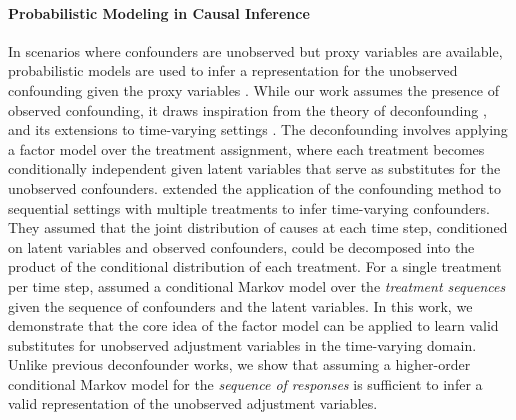 \documentclass[10pt]{article} %
\begin{document}
\paragraph{Probabilistic Modeling in Causal Inference} In scenarios where confounders are unobserved but proxy variables are available, probabilistic models are used to infer a representation for the unobserved confounding given the proxy variables \citep{MeasbiasproxyConf, MiaoProxyUnmeasuredConf2016, louizos2017causalproxyconf, LuChengCMAproxynConf20121}. While our work assumes the presence of observed confounding, it draws inspiration from the theory of deconfounding \citep{lopezmultipletreatments, ranganath2018multiple, wang2019blessings}, and its extensions to time-varying settings \citep{Bica2020TimeSDecounf, hatt2024sequential}. The deconfounding involves applying a factor model over the treatment assignment, where each treatment becomes conditionally independent given latent variables that serve as substitutes for the unobserved confounders. \cite{Bica2020TimeSDecounf} extended the application of the confounding method to sequential settings with multiple treatments to infer time-varying confounders. They assumed that the joint distribution of causes at each time step, conditioned on latent variables and observed confounders, could be decomposed into the product of the conditional distribution of each treatment. For a single treatment per time step, \cite{hatt2024sequential} assumed a conditional Markov model over the \emph{treatment sequences} given the sequence of confounders and the latent variables.  In this work, we demonstrate that the core idea of the factor model can be applied to learn valid substitutes for unobserved adjustment variables in the time-varying domain. Unlike previous deconfounder works, we show that assuming a higher-order conditional Markov model for the \emph{sequence of responses} is sufficient to infer a valid representation of the unobserved adjustment variables.
\end{document}
